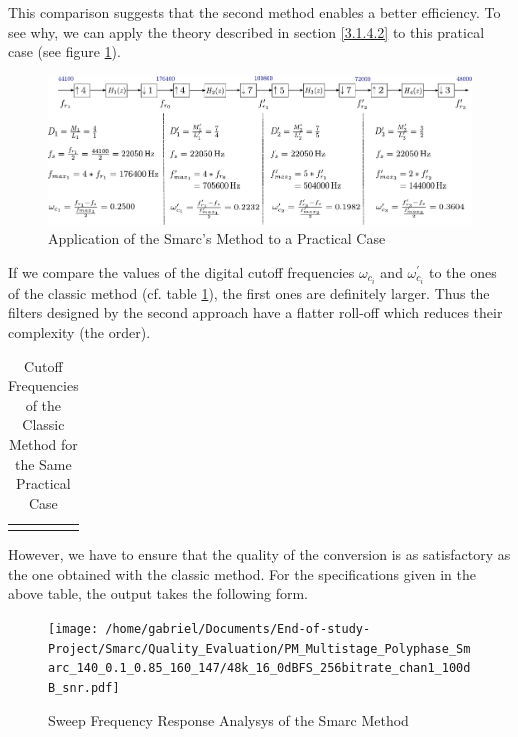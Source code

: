 This comparison suggests that the second method enables a better efficiency. To see why, we can apply the theory described in section \ref{3.1.4.2} to this pratical case (see figure \ref{Figure 3.27}). 

\begin{figure}[ht!]
	\hspace*{-1cm}
	\centering
	\includegraphics[scale=0.8]{smarc.pdf}
	\caption{Application of the Smarc's Method to a Practical Case}\label{Figure 3.27}
\end{figure}

If we compare the values of the digital cutoff frequencies $\omega_{c_i}$ and $\omega^{\prime}_{c_i}$ to the ones of the classic method (cf. table \ref{tab:cutoff_classic}), the first ones are definitely larger. Thus the filters designed by the second approach have a flatter roll-off which reduces their complexity (the order). 


\begin{table}[ht!]
	\centering
	\begin{tabular}{|c|c|c|c|}\hline
		 \makebox[8em]{Stage 1} &  \makebox[8em]{Stage 2} &  \makebox[8em]{Stage 3} &  \makebox[8em]{Stage 3}\\ \hline
		 \makebox[8em]{$\omega_{c_1} = 0.2500$} &  \makebox[8em]{$\omega_{c_2} = 0.1429$} &  \makebox[8em]{$\omega_{c_3} = 0.1429$} &  \makebox[8em]{$\omega_{c_4} = 0.3333$}\\ \hline
	\end{tabular}
\captionsetup{width=0.95\linewidth}
\caption{Cutoff Frequencies of the Classic Method for the Same Practical Case}
\label{tab:cutoff_classic}
\end{table}


However, we have to ensure that the quality of the conversion is as satisfactory as the one obtained with the classic method.
For the specifications given in the above table, the output takes the following form. 

\begin{figure}[ht!]
	\centering
	\texttt{[image: /home/gabriel/Documents/End-of-study-Project/Smarc/Quality\_Evaluation/PM\_Multistage\_Polyphase\_Smarc\_140\_0.1\_0.85\_160\_147/48k\_16\_0dBFS\_256bitrate\_chan1\_100dB\_snr.pdf]}
	\captionsetup{width=0.95\linewidth}
	\caption{Sweep Frequency Response Analysys of the Smarc Method}\label{Figure 3.28}
\end{figure}


